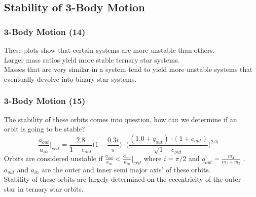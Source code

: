 \documentclass{beamer}
\begin{document}
\subsection{\tiny{Stability of 3-Body Motion}}
\begin{frame}
\frametitle{3-Body Motion (14)}
These plots show that certain systems are more unstable than others.\\
\vspace{20pt}
Larger mass ratios yield more stable ternary star systems.\\
\vspace{20pt}
Masses that are very similar in a system tend to yield more unstable systems that eventually devolve into binary star systems.
\end{frame}
\begin{frame}
\frametitle{3-Body Motion (15)}
The stability of these orbits comes into question, how can we determine if an orbit is going to be stable?
\begin{equation}
\frac{a_{out}}{a_{in}}|_{crit}=\frac{2.8}{1-e_{out}}\Big(1-\frac{0.3i}{\pi}\Big)\cdot\Big(\frac{(1.0+q_{out})\cdot(1+e_{out})}{\sqrt{1-e_{out}}}\Big)^{2/5}
\end{equation}
Orbits are considered unstable if $\frac{a_{out}}{a_{in}}<\frac{a_{out}}{a_{in}}|_{crit}$ where $i=\pi/2$ and 
$q_{out}=\frac{m_3}{m_1+m_2}$ \cite{Triple Star}. $a_{out}$ and $a_{in}$ are the outer and inner semi major axis' of these orbits.\\
\vspace{20pt}
Stability of these orbits are largely determined on the eccentricity of the outer star in ternary star orbits.
\end{frame}
\end{document}
